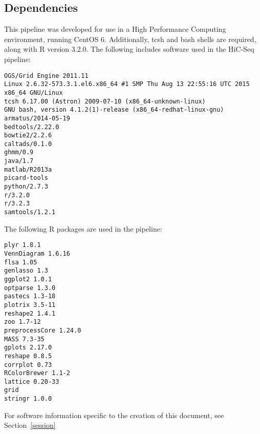 \subsection{Dependencies}\label{Intro:dependencies}
This pipeline was developed for use in a High Performance Computing environment, running CentOS 6. Additionally, tcsh and bash shells are required, along with R version 3.2.0. The following includes software used in the HiC-Seq pipeline:
\begin{lstlisting} 
OGS/Grid Engine 2011.11
Linux 2.6.32-573.3.1.el6.x86_64 #1 SMP Thu Aug 13 22:55:16 UTC 2015 x86_64 GNU/Linux
tcsh 6.17.00 (Astron) 2009-07-10 (x86_64-unknown-linux)
GNU bash, version 4.1.2(1)-release (x86_64-redhat-linux-gnu)
armatus/2014-05-19
bedtools/2.22.0
bowtie2/2.2.6
caltads/0.1.0
ghmm/0.9
java/1.7
matlab/R2013a
picard-tools
python/2.7.3
r/3.2.0
r/3.2.3
samtools/1.2.1
\end{lstlisting}

The following R packages are used in the pipeline:
\begin{lstlisting} 
plyr 1.8.1
VennDiagram 1.6.16
flsa 1.05
genlasso 1.3
ggplot2 1.0.1
optparse 1.3.0
pastecs 1.3-18 
plotrix 3.5-11
reshape2 1.4.1
zoo 1.7-12
preprocessCore 1.24.0
MASS 7.3-35
gplots 2.17.0
reshape 0.8.5
corrplot 0.73
RColorBrewer 1.1-2
lattice 0.20-33
grid
stringr 1.0.0
\end{lstlisting} 

For software information specific to the creation of this document, see Section~\ref{session}